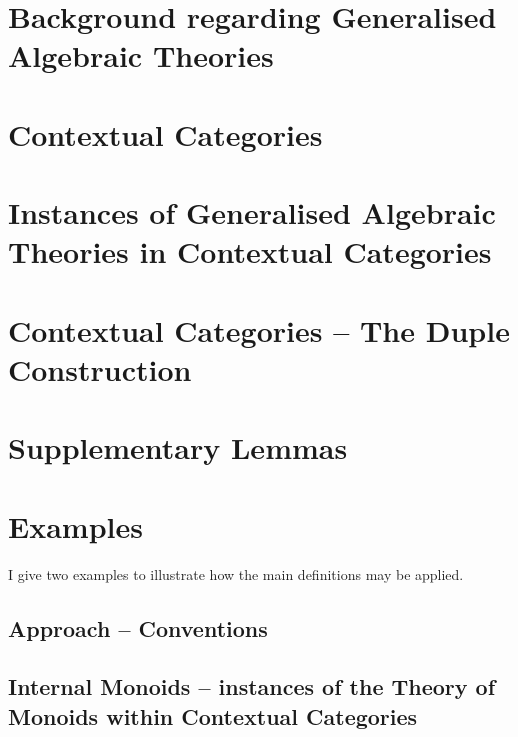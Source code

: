 \documentclass[10pt,a4paper]{article}
\theoremstyle{remark}
\begin{document}
\section{Background regarding Generalised Algebraic Theories}


\section{Contextual Categories }


% 

\section{Instances of Generalised Algebraic Theories in Contextual Categories}
\label{sectioninwhichinstanceisdefined}

\section{Contextual Categories -- The Duple Construction}
\label{contextualnotationparttwo}


\section{Supplementary Lemmas}



\section{Examples}
\label{examples}
I give two examples to illustrate how the main definitions may be applied.
\subsection{Approach -- Conventions}


\subsection{Internal Monoids -- instances of the Theory of Monoids within Contextual Categories}
\label{monoidsinstanceexample} 
 
\end{document}
